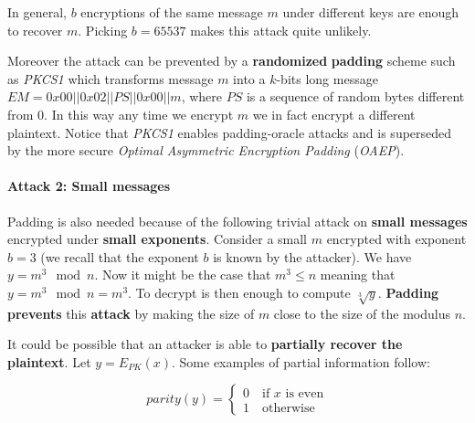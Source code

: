 
In general, $b$ encryptions of the same message $m$ under different keys are enough to recover $m$. Picking $b = 65537$ makes this attack quite unlikely. 

Moreover the attack can be prevented by a \textbf{randomized} \textbf{padding} scheme such as \textit{PKCS1} which transforms message $m$ into a $k$-bits long message $EM = 0x00 || 0x02 || PS || 0x00 || m$, where $PS$ is a sequence of random bytes different from 0. In this way any time we encrypt $m$ we in fact encrypt a different plaintext. Notice that \textit{PKCS1} enables padding-oracle attacks and is superseded by the more secure \textit{Optimal Asymmetric Encryption Padding} (\textit{OAEP}).

\paragraph{Attack 2: Small messages}
Padding is also needed because of the following trivial attack on \textbf{small messages} encrypted under \textbf{small exponents}. Consider a small $m$ encrypted with exponent $b = 3$ (we recall that the exponent $b$ is known by the attacker). We have $y = m^3 \mod n$. Now it might be the case that $m^3 \leq n$ meaning that $y = m^3 \mod n = m^3$. To decrypt is then enough to compute $\sqrt[3]{y}$. \textbf{Padding} \textbf{prevents} this \textbf{attack} by making the size of $m$ close to the size of the modulus $n$.

It could be possible that an attacker is able to \textbf{partially recover the plaintext}. Let $y = E_{PK}(x)$. Some examples of partial information follow:

$$
\mathit{parity}(y) = \begin{cases}
    0 \quad \text{if $x$ is even} \\
    1 \quad \text{otherwise}
\end{cases}
$$


